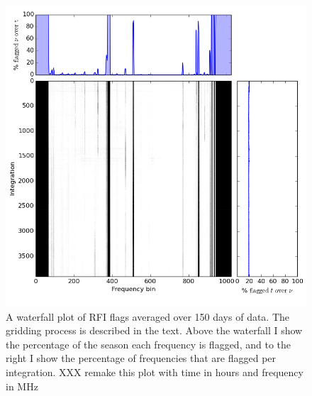 \documentclass[10pt,a4paper]{article}
\begin{document}
\begin{figure}
\centering
\includegraphics[width=\textwidth]{RFI-images/149days.png} %
\caption{A waterfall plot of RFI flags averaged over 150 days of data. The gridding process is described in the text. Above the waterfall I show the percentage of the season each frequency is flagged, and to the right I show the percentage of frequencies that are flagged per integration. XXX remake this plot with time in hours and frequency in MHz}
\label{fig:average-waterfall}
\end{figure}
\end{document}
